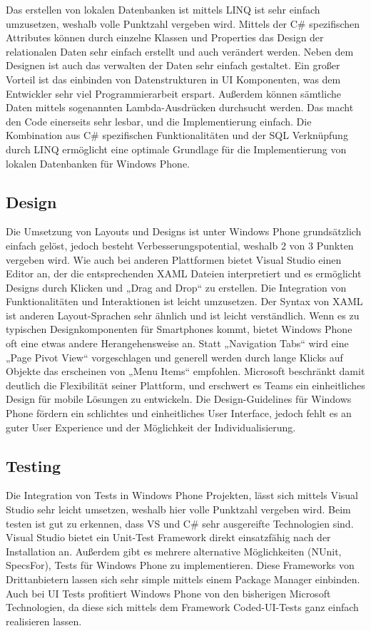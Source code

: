 Das erstellen von lokalen Datenbanken ist mittels LINQ ist sehr einfach umzusetzen, weshalb volle Punktzahl vergeben wird. Mittels der C\# spezifischen Attributes können durch einzelne Klassen und Properties das Design der relationalen Daten sehr einfach erstellt und auch verändert werden. Neben dem Designen ist auch das verwalten der Daten sehr einfach gestaltet. Ein großer Vorteil ist das einbinden von Datenstrukturen in UI Komponenten, was dem Entwickler sehr viel Programmierarbeit erspart. Außerdem können sämtliche Daten mittels sogenannten Lambda-Ausdrücken durchsucht werden. Das macht den Code einerseits sehr lesbar, und die Implementierung einfach. Die Kombination aus C\# spezifischen Funktionalitäten und der SQL Verknüpfung durch LINQ ermöglicht eine optimale Grundlage für die Implementierung von lokalen Datenbanken für Windows Phone. 

\subsection{Design}

Die Umsetzung von Layouts und Designs ist unter Windows Phone grundsätzlich einfach gelöst, jedoch besteht Verbesserungspotential, weshalb 2 von 3 Punkten vergeben wird. Wie auch bei anderen Plattformen bietet Visual Studio einen Editor an, der die entsprechenden XAML Dateien interpretiert und es ermöglicht Designs durch Klicken und „Drag and Drop“ zu erstellen. Die Integration von Funktionalitäten und Interaktionen ist leicht umzusetzen. Der Syntax von XAML ist anderen Layout-Sprachen sehr ähnlich und ist leicht verständlich. Wenn es zu typischen Designkomponenten für Smartphones kommt, bietet Windows Phone oft eine etwas andere Herangehensweise an. Statt „Navigation Tabs“ wird eine „Page Pivot View“ vorgeschlagen und generell werden durch lange Klicks auf Objekte das erscheinen von „Menu Items“ empfohlen. Microsoft beschränkt damit deutlich die Flexibilität seiner Plattform, und erschwert es Teams ein einheitliches Design für mobile Lösungen zu entwickeln. Die Design-Guidelines für Windows Phone fördern ein schlichtes und einheitliches User Interface, jedoch fehlt es an guter User Experience und der Möglichkeit der Individualisierung.

\subsection{Testing}

Die Integration von Tests in Windows Phone Projekten, lässt  sich mittels Visual Studio sehr leicht umsetzen, weshalb hier volle Punktzahl vergeben wird. Beim testen ist gut zu erkennen, dass VS und C\# sehr ausgereifte Technologien sind. Visual Studio bietet ein Unit-Test Framework direkt einsatzfähig nach der Installation an. Außerdem gibt es mehrere alternative Möglichkeiten (NUnit, SpecsFor), Tests für Windows Phone zu implementieren. Diese Frameworks von Drittanbietern lassen sich sehr simple mittels einem Package Manager einbinden. Auch bei UI Tests profitiert Windows Phone von den bisherigen Microsoft Technologien, da diese sich mittels dem Framework Coded-UI-Tests ganz einfach realisieren lassen. 
